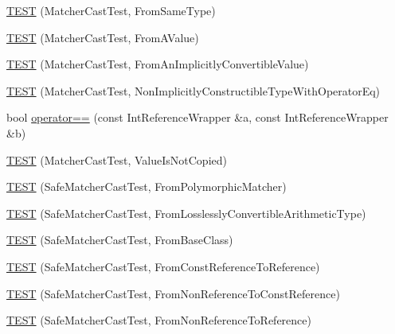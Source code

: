 \begin{DoxyCompactItemize}
\item 
\mbox{\hyperlink{namespacetesting_1_1gmock__matchers__test_a8f845dd5b1bcdc660926d67dce32b5d2}{T\+E\+ST}} (Matcher\+Cast\+Test, From\+Same\+Type)
\item 
\mbox{\hyperlink{namespacetesting_1_1gmock__matchers__test_a9dfc74e2f4c110e33bd7863c8bfd4532}{T\+E\+ST}} (Matcher\+Cast\+Test, From\+A\+Value)
\item 
\mbox{\hyperlink{namespacetesting_1_1gmock__matchers__test_af7fee66e5f72e05ba28bcf122b127a95}{T\+E\+ST}} (Matcher\+Cast\+Test, From\+An\+Implicitly\+Convertible\+Value)
\item 
\mbox{\hyperlink{namespacetesting_1_1gmock__matchers__test_a37953ae898b7426bce3104d95c098cba}{T\+E\+ST}} (Matcher\+Cast\+Test, Non\+Implicitly\+Constructible\+Type\+With\+Operator\+Eq)
\item 
bool \mbox{\hyperlink{namespacetesting_1_1gmock__matchers__test_a33c068c32bf5118e5be92771b146db77}{operator==}} (const Int\+Reference\+Wrapper \&a, const Int\+Reference\+Wrapper \&b)
\item 
\mbox{\hyperlink{namespacetesting_1_1gmock__matchers__test_ae99c08c8a815964b61f98a4785cf79b5}{T\+E\+ST}} (Matcher\+Cast\+Test, Value\+Is\+Not\+Copied)
\item 
\mbox{\hyperlink{namespacetesting_1_1gmock__matchers__test_a29c04361c022a71711dbf9d3cf2a5050}{T\+E\+ST}} (Safe\+Matcher\+Cast\+Test, From\+Polymorphic\+Matcher)
\item 
\mbox{\hyperlink{namespacetesting_1_1gmock__matchers__test_a70bbe53742db988a828d9e8201e34770}{T\+E\+ST}} (Safe\+Matcher\+Cast\+Test, From\+Losslessly\+Convertible\+Arithmetic\+Type)
\item 
\mbox{\hyperlink{namespacetesting_1_1gmock__matchers__test_a937469149aee65efde526091af1e4f78}{T\+E\+ST}} (Safe\+Matcher\+Cast\+Test, From\+Base\+Class)
\item 
\mbox{\hyperlink{namespacetesting_1_1gmock__matchers__test_a14ba7c67551222321056e4da6708010f}{T\+E\+ST}} (Safe\+Matcher\+Cast\+Test, From\+Const\+Reference\+To\+Reference)
\item 
\mbox{\hyperlink{namespacetesting_1_1gmock__matchers__test_ad53741423311d4f76d9d980f59ec8d65}{T\+E\+ST}} (Safe\+Matcher\+Cast\+Test, From\+Non\+Reference\+To\+Const\+Reference)
\item 
\mbox{\hyperlink{namespacetesting_1_1gmock__matchers__test_a362ce5b2b395dfd6363e4d80b49951f1}{T\+E\+ST}} (Safe\+Matcher\+Cast\+Test, From\+Non\+Reference\+To\+Reference)
\item 

\end{DoxyCompactItemize}
